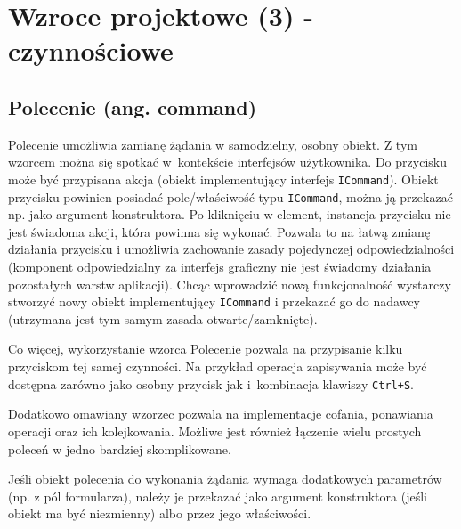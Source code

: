 \section{Wzroce projektowe (3) - czynnościowe }
\subsection{Polecenie (ang. command)}
Polecenie umożliwia zamianę żądania w samodzielny, osobny obiekt. Z tym wzorcem można się spotkać w~kontekście interfejsów użytkownika. Do przycisku może być przypisana akcja (obiekt implementujący interfejs \texttt{ICommand}). Obiekt przycisku powinien posiadać pole/właściwość typu \texttt{ICommand}, można ją przekazać np. jako argument konstruktora. Po kliknięciu w element, instancja przycisku nie jest świadoma akcji, która powinna się wykonać. Pozwala to na łatwą zmianę działania przycisku i umożliwia zachowanie zasady pojedynczej odpowiedzialności (komponent odpowiedzialny za interfejs graficzny nie jest świadomy działania pozostałych warstw aplikacji). Chcąc wprowadzić nową funkcjonalność wystarczy stworzyć nowy obiekt implementujący \texttt{ICommand} i przekazać go do nadawcy (utrzymana jest tym samym zasada otwarte/zamknięte). 

Co więcej, wykorzystanie wzorca Polecenie pozwala na przypisanie kilku przyciskom tej samej czynności. Na przykład operacja zapisywania może być dostępna zarówno jako osobny przycisk jak i~kombinacja klawiszy \texttt{Ctrl+S}.

Dodatkowo omawiany wzorzec pozwala na implementacje cofania, ponawiania operacji oraz ich kolejkowania. Możliwe jest również łączenie wielu prostych poleceń w jedno bardziej skomplikowane.

Jeśli obiekt polecenia do wykonania żądania wymaga dodatkowych parametrów (np. z pól formularza), należy je przekazać jako argument konstruktora (jeśli obiekt ma być niezmienny) albo przez jego właściwości.







